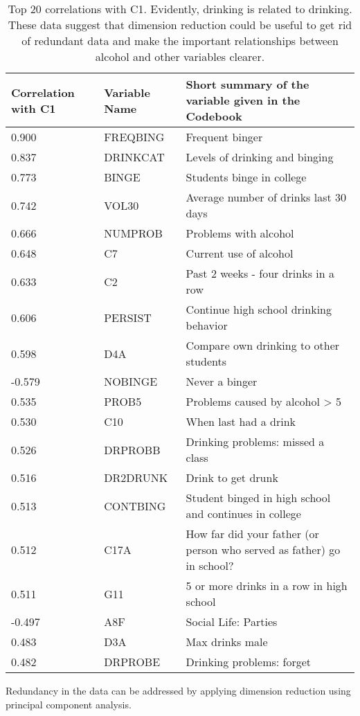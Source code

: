 \begin{center}
\begin{table*}[ht]
\begin{tabular}{l l l}
\hline \hline
Correlation with C1 & Variable Name &Short summary of the variable given in the Codebook\\ \hline 
0.900 & FREQBING	&Frequent binger\\
0.837 & DRINKCAT	&Levels of drinking and binging\\
0.773 & BINGE		&Students binge in college\\
0.742 & VOL30		&Average number of drinks last 30 days\\
0.666 & NUMPROB	&Problems with alcohol\\
0.648 & C7		&Current use of alcohol\\
0.633 & C2		&Past 2 weeks - four drinks in a row\\
0.606 & PERSIST	&Continue high school drinking behavior\\
0.598 & D4A		&Compare own drinking to other students\\
-0.579 & NOBINGE	&Never a binger\\
0.535 & PROB5	&Problems caused by alcohol > 5\\
0.530 & C10		&When last had a drink\\
0.526 & DRPROBB	&Drinking problems: missed a class \\
0.516 & DR2DRUNK&Drink to get drunk\\
0.513 & CONTBING	&Student binged in high school and continues in college\\
0.512 &C17A		&How far did your father (or person who served as father) go in school?\\
0.511 & G11		&5 or more drinks in a row in high school\\
-0.497 & A8F		&Social Life: Parties\\
0.483 & D3A		&Max drinks male\\
0.482 & DRPROBE	&Drinking problems: forget\\
\hline
\end{tabular}
\caption{Top 20 correlations with C1. Evidently, drinking is related to drinking. These data suggest that dimension reduction could be useful to get rid of redundant data and make the important relationships between alcohol and other variables clearer.}
\label{correlations}
\end{table*}
\end{center}

Redundancy in the data can be addressed by applying dimension reduction using principal component analysis.
